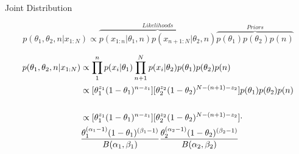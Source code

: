 \documentclass[
  ignorenonframetext,
]{beamer}
\begin{document}
\begin{frame}{Joint Distribution}
\protect\hypertarget{joint-distribution}{}

\footnotesize

\begin{equation}
p(\theta_{1}, \theta_{2}, n| x_{1:N}) \propto \overbrace{p(x_{1:n}|\theta_{1},n)
p(x_{n+1:N}|\theta_{2},n)}^{Likelihoods}
\overbrace{p(\theta_{1})p(\theta_{2})p(n)}^{Priors}
\end{equation}

\begin{equation}
\label{eq:ChgPtJoint}
\begin{aligned}
p(\theta_{1}, \theta_{2}, n| x_{1:N}) &\propto 
  \prod_{1}^{n}p(x_{i}|\theta_{1})
  \prod_{n+1}^{N}p(x_{i}|\theta_{2})
  p(\theta_{1})p(\theta_{2})p(n)\\
&\propto [\theta_{1}^{z_{1}}(1-\theta_{1})^{n-z_{1}}]
  [\theta_{2}^{z_{2}}(1-\theta_{2})^{N-(n+1)-z_{2}}]
  p(\theta_{1})p(\theta_{2})p(n)\\
  \\
&\propto [\theta_{1}^{z_{1}}(1-\theta_{1})^{n-z_{1}}]
  [\theta_{2}^{z_{2}}(1-\theta_{2})^{N-(n+1)-z_{2}}] \cdot \\
 & {{\theta_{1}^{(\alpha_{1}-1)}(1-\theta_{1})^{(\beta_{1}-1)}}\over B(\alpha_{1},\beta_{1})}
  {{\theta_{2}^{(\alpha_{2}-1)}(1-\theta_{2})^{(\beta_{2}-1)}}\over B(\alpha_{2},\beta_{2})}\\
  \\
\end{aligned}
\end{equation}

\end{frame}
\end{document}
